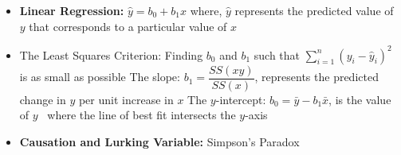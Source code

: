 \documentclass[twoside]{article}
\newcommand{\0}{\mathbf{0}}
\begin{document}
\begin{itemize}
\item \textbf{Linear Regression:} $\hat{y}=b_0+b_1x$
\subitem where, $\hat{y}$ represents the predicted value of $y$ that corresponds to a particular value of $x$
\item The Least Squares Criterion: Finding $b_0$ and $b_1$ such that $\sum_{i=1}^n(y_i-\hat{y}_i)^2$ is as small as possible
\subitem The slope: $b_1=\dfrac{SS(xy)}{SS(x)}$, represents the predicted change in $y$ per unit increase in $x$
\subitem The $y$-intercept: $b_0=\bar{y}-b_1\bar{x}$, is the value of $y$ \ where the line of best fit intersects the $y$-axis
\item \textbf{Causation and Lurking Variable:}
\subitem Simpson’s Paradox
\end{itemize}
\end{document}
